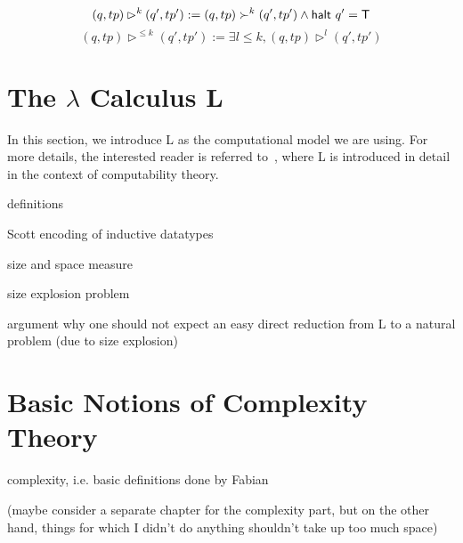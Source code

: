 \begin{definition}
  \[ (q, tp) \rhd^{k} (q', tp') := (q, tp) \succ^k (q', tp') \land \textsf{halt}~q' = \mathsf{T}\]
  \[ (q, tp) \rhd^{\le k} (q', tp') := \exists l \le k, (q, tp) \rhd^l (q', tp') \]
\end{definition}

\section{The $\lambda$ Calculus L}
In this section, we introduce L as the computational model we are using. For more details, the interested reader is referred to~\cite{ForsterSmolka:2017:L-Computability}, where L is introduced in detail in the context of computability theory.

definitions

Scott encoding of inductive datatypes

size and space measure

size explosion problem

argument why one should not expect an easy direct reduction from L to a natural problem (due to size explosion)

\section{Basic Notions of Complexity Theory}
complexity, i.e. basic definitions done by Fabian

(maybe consider a separate chapter for the complexity part, but on the other hand, things for which I didn't do anything shouldn't take up too much space)



